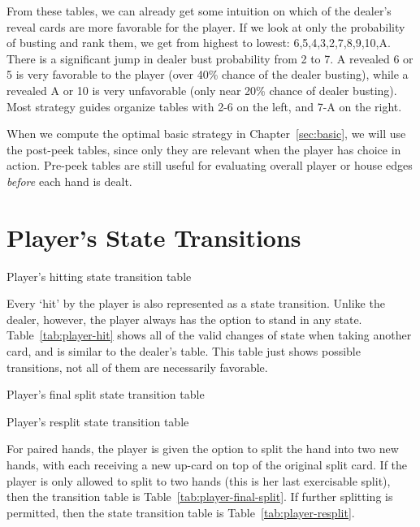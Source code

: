 From these tables, we can already get some intuition on
which of the dealer's reveal cards are more favorable for the player.
If we look at only the probability of busting and rank them, 
we get from highest to lowest: 6,5,4,3,2,7,8,9,10,A.
There is a significant jump in dealer bust probability from 2 to 7.  
A revealed 6 or 5 is very favorable to the player (over 40\% chance of 
the dealer busting), 
while a revealed A or 10 is very unfavorable 
(only near 20\% chance of dealer busting).
Most strategy guides organize tables with 2-6 on the left, 
and 7-A on the right.


When we compute the optimal basic strategy in Chapter~\ref{sec:basic}, 
we will use the post-peek tables, since only they are relevant
when the player has choice in action.  
Pre-peek tables are still useful for evaluating overall player or house
edges \emph{before} each hand is dealt.

\section{Player's State Transitions}
\label{sec:rules:player-hit}

\begin{table}[ht!]
\caption{Player's hitting state transition table}
\begin{center}

\end{center}
\label{tab:player-hit}
\end{table}

Every `hit' by the player is also represented as a state transition.
Unlike the dealer, however, the player always has the option
to stand in any state.
Table~\ref{tab:player-hit} shows all of the valid changes of state
when taking another card, and is similar to the dealer's table.
This table just shows possible transitions, 
not all of them are necessarily favorable.

\begin{table}[ht!]
\caption{Player's final split state transition table}
\begin{center}

\end{center}
\label{tab:player-final-split}
\end{table}

\begin{table}[ht!]
\caption{Player's resplit state transition table}
\begin{center}

\end{center}
\label{tab:player-resplit}
\end{table}

For paired hands, the player is given the option to split the
hand into two new hands, with each receiving a new up-card on top
of the original split card.
If the player is only allowed to split to two hands
(this is her last exercisable split), 
then the transition table is Table~\ref{tab:player-final-split}.
If further splitting is permitted, then the state transition table
is Table~\ref{tab:player-resplit}.

